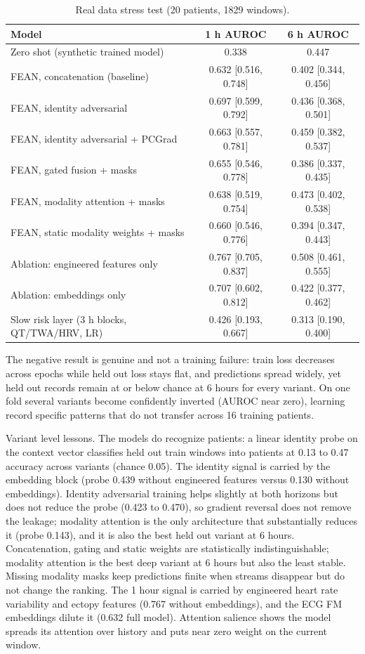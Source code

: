 \documentclass[11pt]{article}
\begin{document}
\begin{table}[h]
\centering
\caption{Real data stress test (20 patients, 1829 windows).}
\begin{tabular}{lcc}
\toprule
Model & 1 h AUROC & 6 h AUROC \\
\midrule
Zero shot (synthetic trained model) & 0.338 & 0.447 \\
FEAN, concatenation (baseline) & 0.632 [0.516, 0.748] & 0.402 [0.344, 0.456] \\
FEAN, identity adversarial & 0.697 [0.599, 0.792] & 0.436 [0.368, 0.501] \\
FEAN, identity adversarial + PCGrad & 0.663 [0.557, 0.781] & 0.459 [0.382, 0.537] \\
FEAN, gated fusion + masks & 0.655 [0.546, 0.778] & 0.386 [0.337, 0.435] \\
FEAN, modality attention + masks & 0.638 [0.519, 0.754] & 0.473 [0.402, 0.538] \\
FEAN, static modality weights + masks & 0.660 [0.546, 0.776] & 0.394 [0.347, 0.443] \\
Ablation: engineered features only & 0.767 [0.705, 0.837] & 0.508 [0.461, 0.555] \\
Ablation: embeddings only & 0.707 [0.602, 0.812] & 0.422 [0.377, 0.462] \\
Slow risk layer (3 h blocks, QT/TWA/HRV, LR) & 0.426 [0.193, 0.667] & 0.313 [0.190, 0.400] \\
\bottomrule
\end{tabular}
\end{table}

The negative result is genuine and not a training failure: train loss
decreases across epochs while held out loss stays flat, and predictions spread
widely, yet held out records remain at or below chance at 6 hours for every
variant. On one fold several variants become confidently inverted (AUROC near
zero), learning record specific patterns that do not transfer across 16
training patients.

Variant level lessons. The models do recognize patients: a linear identity
probe on the context vector classifies held out train windows into patients at
0.13 to 0.47 accuracy across variants (chance 0.05). The identity signal is
carried by the embedding block (probe 0.439 without engineered features versus
0.130 without embeddings). Identity adversarial training helps slightly at
both horizons but does not reduce the probe (0.423 to 0.470), so gradient
reversal does not remove the leakage; modality attention is the only
architecture that substantially reduces it (probe 0.143), and it is also the
best held out variant at 6 hours. Concatenation, gating and static weights are
statistically indistinguishable; modality attention is the best deep variant
at 6 hours but also the least stable. Missing modality masks keep predictions
finite when streams disappear but do not change the ranking. The 1 hour signal
is carried by engineered heart rate variability and ectopy features (0.767
without embeddings), and the ECG FM embeddings dilute it (0.632 full model).
Attention salience shows the model spreads its attention over history and puts
near zero weight on the current window.
\end{document}
